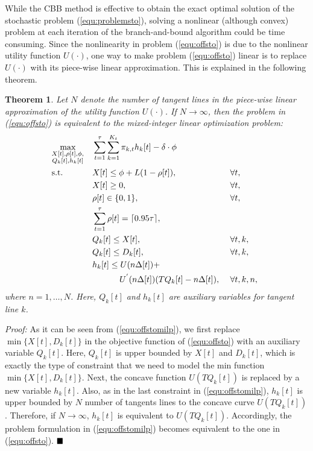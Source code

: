 \documentclass[10pt,journal,compsoc]{IEEEtran}
\newtheorem{theorem}{Theorem}
\begin{document}
While the CBB method is effective to obtain the exact optimal solution of the stochastic  problem (\ref{equ:problemsto}), solving a nonlinear (although convex) problem at each iteration of the branch-and-bound algorithm could be time consuming. Since the nonlinearity in problem (\ref{equ:offsto}) is due to the nonlinear utility function $U(\cdot)$, one way to make problem (\ref{equ:offsto}) linear is to replace $U(\cdot)$ with its piece-wise linear approximation. This is explained in the following theorem.

\vspace{0.1cm}

\begin{theorem} \label{theorem4}
Let $N$ denote the number of tangent lines in the piece-wise linear approximation of the utility function $U(\cdot)$. If $N \rightarrow \infty$, then the problem in (\ref{equ:offsto}) is equivalent to the  mixed-integer linear optimization problem:
\begin{equation}\label{equ:offstomilp}
\begin{aligned}
& \underset{\begin{subarray}{c}X[t],\rho[t],\phi,\\ Q_{k}[t],h_{k}[t] \end{subarray}}{\text{max}}
& &\sum_{t=1}^{\tau} {\sum_{k=1}^{K_{t}} {\pi_{k,t} h_{k}[t]}}-\delta \cdot \phi\\
& \text{s.t.}
& & X[t]\leq \phi+L(1-\rho[t]), && \forall t, \\
&&& X[t] \geq 0, && \forall t, \\
&&& \rho[t] \in \{0,1\}, &&  \forall t, \\
&&& \sum_{t=1}^{\tau} {\rho[t]}=\lceil0.95\tau\rceil, \\
&&& Q_{k}[t] \leq X[t], && \forall t,k,\\
&&& Q_{k}[t] \leq D_{k}[t], && \forall t,k,\\
&&& h_k[t] \leq U(n\Delta[t])+\\
&&& \ \ \ \ \ \ \ \ \ \: U^{'}(n\Delta[t])(TQ_{k}[t]-n\Delta[t]), \quad \!\!\!\! && \forall t,k,n,
\end{aligned} \!\!\!
\end{equation}
where $n = 1,\ldots, N$. Here, $Q_{k}[t]$ and $h_k[t]$ are auxiliary variables for tangent line $k$.
\end{theorem}

\vspace{0.1cm}

\emph{Proof:} As it can be seen from (\ref{equ:offstomilp}), we first replace  $\min \{X[t],D_{k}[t]\}$ in the objective function of (\ref{equ:offsto}) with an auxiliary variable $Q_{k}[t]$. Here,   $Q_{k}[t]$ is upper bounded by $X[t]$ and $D_{k}[t]$, which is exactly the type of constraint that we need to model the min function $\min \{X[t],D_{k}[t]\}$. Next, the concave function $U(TQ_k[t])$ is replaced by a new variable $h_k[t]$. Also, as in the last constraint in (\ref{equ:offstomilp}), $h_k[t]$ is upper bounded by $N$ number of tangents lines to the concave curve $U(TQ_k[t])$. Therefore, if $N \to \infty$, $h_k[t]$ is equivalent to $U(TQ_k[t])$. Accordingly, the problem formulation in (\ref{equ:offstomilp}) becomes equivalent to the one in (\ref{equ:offsto}). $\hfill \blacksquare$
\end{document}
